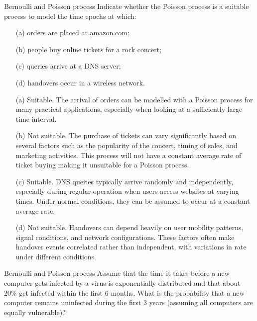 \begin{problem}{Bernoulli and Poisson process}
Indicate whether the Poisson process is a suitable process to model the time epochs at which:
\begin{itemize}
    \item[(a)] orders are placed at \url{amazon.com};
    \item[(b)] people buy online tickets for a rock concert;
    \item[(c)] queries arrive at a DNS server;
    \item[(d)] handovers occur in a wireless network.
\end{itemize}
\end{problem}
\begin{solution}
\begin{itemize}
\item[(a)] Suitable. The arrival of orders can be modelled with a Poisson process for many practical applications, especially when looking at a sufficiently large time interval.
\item[(b)] Not suitable. The purchase of tickets can vary significantly based on several factors such as the popularity of the concert, timing of sales, and marketing activities. This process will not have a constant average rate of ticket buying making it unsuitable for a Poisson process.
\item[(c)] Suitable. DNS queries typically arrive randomly and independently, especially during regular operation when users access websites at varying times. Under normal conditions, they can be assumed to occur at a constant average rate.
\item[(d)] Not suitable. Handovers can depend heavily on user mobility patterns, signal conditions, and network configurations. These factors often make handover events correlated rather than independent, with variations in rate under different conditions.
\end{itemize}
\end{solution}

\begin{problem}{Bernoulli and Poisson process}
Assume that the time it takes before a new computer gets infected by a virus is exponentially distributed and that about 20\% get infected within the first 6 months. What is the probability that a new computer remains uninfected during the first 3 years (assuming all computers are equally vulnerable)?
\end{problem}

